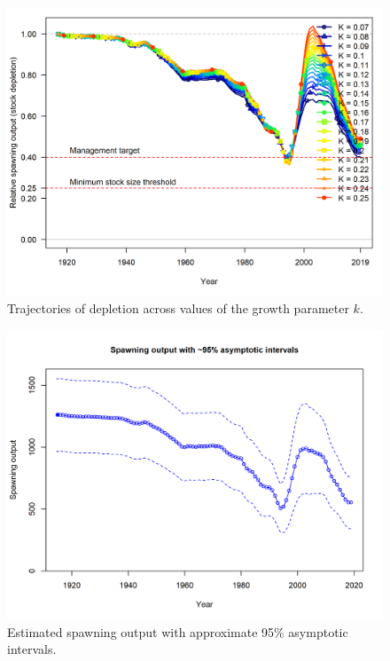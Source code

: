 \documentclass[12pt,]{article}
\begin{document}
\FloatBarrier

\begin{figure}
\centering
\includegraphics{Figures/profile_k_depl.png}
\caption{Trajectories of depletion across values of the growth parameter
\(k\). \label{fig:profile_k_depl}}
\end{figure}

\begin{figure}
\centering
\includegraphics{r4ss/plots_mod1/ts7_Spawning_output_with_95_asymptotic_intervals_intervals.png}
\caption{Estimated spawning output with approximate 95\% asymptotic
intervals.
\label{fig:ts7_Spawning_biomass_(mt)_with_95_asymptotic_intervals_intervals}}
\end{figure}
\end{document}
